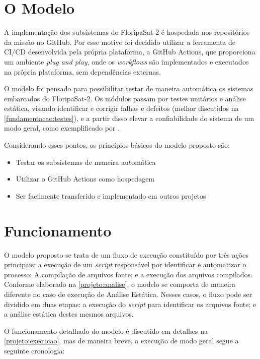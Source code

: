 \section{O Modelo}
\label{proposta:modelo}
A implementação dos subsistemas do FloripaSat-2 é hospedada nos repositórios da missão no GitHub. Por esse motivo foi decidido utilizar a ferramenta de CI/CD desenvolvida pela própria plataforma, a GitHub Actions\cite{gh-actions}, que proporciona um ambiente \textit{plug and play}, onde os \textit{workflows} são implementados e executados na própria plataforma, sem dependências externas.

O modelo foi pensado para possibilitar testar de maneira automática os sistemas embarcados do FloripaSat-2. Os módulos passam por testes unitários e análise estática, visando identificar e corrigir falhas e defeitos (melhor discutidos na \autoref{fundamentacao:testes}), e a partir disso elevar a confiabilidade do sistema de um modo geral, como exemplificado por \cite{chen-2001}.

Considerando esses pontos, os princípios básicos do modelo proposto são:

\begin{itemize}
    \item Testar os subsistemas de maneira automática
    \item Utilizar o GitHub Actions como hospedagem
    \item Ser facilmente transferido e implementado em outros projetos
\end{itemize}

\section{Funcionamento}
\label{proposta:funcionamento}

O modelo proposto se trata de um fluxo de execução constituído por três ações principais: a execução de um \textit{script} responsável por identificar e automatizar o processo; A compilação de arquivos fonte; e a execução dos arquivos compilados. Conforme elaborado na \autoref{projeto:analise}, o modelo se comporta de maneira diferente no caso de execução de Análise Estática. Nesses casos, o fluxo pode ser dividido em duas etapas: a execução do \textit{script} para identificar os arquivos fonte; e a análise estática destes mesmos arquivos.

O funcionamento detalhado do modelo é discutido em detalhes na \autoref{projeto:execucao}, mas de maneira breve, a execução de modo geral segue a seguinte cronologia:

